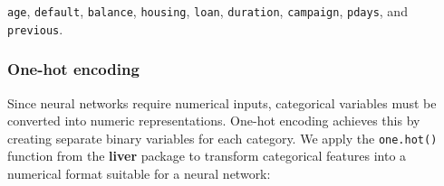 \documentclass[
  11pt,
]{book}
\theoremstyle{definition}
\theoremstyle{definition}
\theoremstyle{definition}
\theoremstyle{definition}
\theoremstyle{remark}
\begin{document}
\texttt{age}, \texttt{default}, \texttt{balance}, \texttt{housing}, \texttt{loan}, \texttt{duration}, \texttt{campaign}, \texttt{pdays}, and \texttt{previous}.

\subsubsection*{One-hot encoding}\label{one-hot-encoding-3}


Since neural networks require numerical inputs, categorical variables must be converted into numeric representations. One-hot encoding achieves this by creating separate binary variables for each category. We apply the \texttt{one.hot()} function from the \textbf{liver} package to transform categorical features into a numerical format suitable for a neural network:
\end{document}
